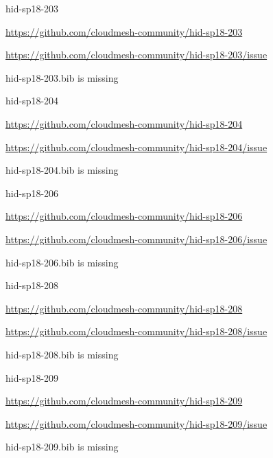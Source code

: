 \begin{IU}

hid-sp18-203

\url{https://github.com/cloudmesh-community/hid-sp18-203}

\url{https://github.com/cloudmesh-community/hid-sp18-203/issue}

hid-sp18-203.bib is missing

\end{IU}


\begin{IU}

hid-sp18-204

\url{https://github.com/cloudmesh-community/hid-sp18-204}

\url{https://github.com/cloudmesh-community/hid-sp18-204/issue}

hid-sp18-204.bib is missing

\end{IU}


\begin{IU}

hid-sp18-206

\url{https://github.com/cloudmesh-community/hid-sp18-206}

\url{https://github.com/cloudmesh-community/hid-sp18-206/issue}

hid-sp18-206.bib is missing

\end{IU}


\begin{IU}

hid-sp18-208

\url{https://github.com/cloudmesh-community/hid-sp18-208}

\url{https://github.com/cloudmesh-community/hid-sp18-208/issue}

hid-sp18-208.bib is missing

\end{IU}


\begin{IU}

hid-sp18-209

\url{https://github.com/cloudmesh-community/hid-sp18-209}

\url{https://github.com/cloudmesh-community/hid-sp18-209/issue}

hid-sp18-209.bib is missing

\end{IU}


